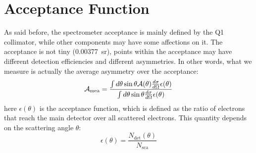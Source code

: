 \begin{comment}
\bigskip
One could also estimate the rate from measurement. 
\begin{eqaution}
    \sigma = \sqrt{\frac{1}{R/30}}
\end{eqaution}
\begin{table}[!h]
    \centering
    \begin{tabular}{c c c | c c c c c c}
	\hline
	Target	& run	& I $(\mu A)$   & \thead{rms \\ ($ppm$)} & \thead{rms@$70\ \mu A$ \\ ($ppm$)} & \thead{bcm res. \\ ($ppm$)}   & \thead{bpm res. \\ ($ppm$)}   & \thead{cor. rms \\ ($ppm$)}  & \thead{rate \\ ($GHz$)}  \\
	\hline
	C12	& 4133	& 86.2	& 143	& 158.7	& 20	& 25	& 150.4	& 1.326	\\
	D-Pb-D	& 4112	& 67.7	& 93	& 91.5	& 20	& 25	& 82.9	& 4.365	\\
	\hline
    \end{tabular}
    \caption{The corrected rms was calculated as: $\sqrt{\frac{\sigma^2 - \sigma^2_{bcm} - \sigma^2_{bpm}}{1 + 0.26^2}}$}
\end{table}
The C graphite target has a thickness of $1.991\ mm$ and a density of 
\end{comment}


\section{Acceptance Function}
As said before, the spectrometer acceptance is mainly defined by the Q1 
collimator, while other components may have some affections on it. The acceptance
is not tiny (0.00377~sr), points within the acceptance may have
different detection efficiencies and different asymmetries. In other words, 
what we measure is actually the average asymmetry over the acceptance:
\begin{equation}
    \mathcal{A}_{\text{mea}} = \frac{\int d\theta \sin\theta \mathcal{A}(\theta) \frac{d\sigma}{d\Omega} \epsilon(\theta)}{\int d\theta \sin\theta \frac{d\sigma}{d\Omega} \epsilon(\theta)}
    \label{eq:acceptance_function}
\end{equation}
here $\epsilon(\theta)$ is the acceptance function, which is defined as
the ratio of electrons that reach the main detector over all scattered
electrons. This quantity depends on the scattering angle $\theta$:
\begin{equation}
    \epsilon(\theta) = \frac{N_{\text{det}}(\theta)}{N_{\text{sca}}}
    \label{eq:acceptance_definition}
\end{equation}


